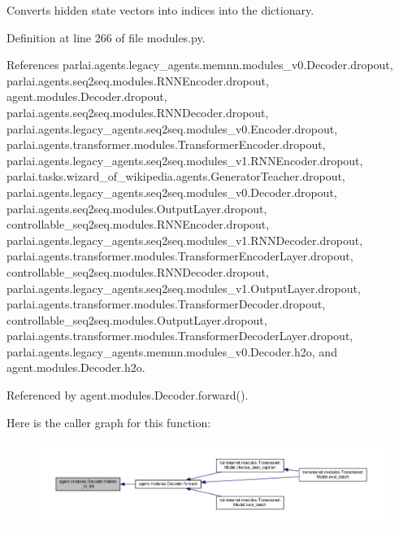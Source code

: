\begin{DoxyVerb}Converts hidden state vectors into indices into the dictionary.\end{DoxyVerb}
 

Definition at line 266 of file modules.\+py.



References parlai.\+agents.\+legacy\+\_\+agents.\+memnn.\+modules\+\_\+v0.\+Decoder.\+dropout, parlai.\+agents.\+seq2seq.\+modules.\+R\+N\+N\+Encoder.\+dropout, agent.\+modules.\+Decoder.\+dropout, parlai.\+agents.\+seq2seq.\+modules.\+R\+N\+N\+Decoder.\+dropout, parlai.\+agents.\+legacy\+\_\+agents.\+seq2seq.\+modules\+\_\+v0.\+Encoder.\+dropout, parlai.\+agents.\+transformer.\+modules.\+Transformer\+Encoder.\+dropout, parlai.\+agents.\+legacy\+\_\+agents.\+seq2seq.\+modules\+\_\+v1.\+R\+N\+N\+Encoder.\+dropout, parlai.\+tasks.\+wizard\+\_\+of\+\_\+wikipedia.\+agents.\+Generator\+Teacher.\+dropout, parlai.\+agents.\+legacy\+\_\+agents.\+seq2seq.\+modules\+\_\+v0.\+Decoder.\+dropout, parlai.\+agents.\+seq2seq.\+modules.\+Output\+Layer.\+dropout, controllable\+\_\+seq2seq.\+modules.\+R\+N\+N\+Encoder.\+dropout, parlai.\+agents.\+legacy\+\_\+agents.\+seq2seq.\+modules\+\_\+v1.\+R\+N\+N\+Decoder.\+dropout, parlai.\+agents.\+transformer.\+modules.\+Transformer\+Encoder\+Layer.\+dropout, controllable\+\_\+seq2seq.\+modules.\+R\+N\+N\+Decoder.\+dropout, parlai.\+agents.\+legacy\+\_\+agents.\+seq2seq.\+modules\+\_\+v1.\+Output\+Layer.\+dropout, parlai.\+agents.\+transformer.\+modules.\+Transformer\+Decoder.\+dropout, controllable\+\_\+seq2seq.\+modules.\+Output\+Layer.\+dropout, parlai.\+agents.\+transformer.\+modules.\+Transformer\+Decoder\+Layer.\+dropout, parlai.\+agents.\+legacy\+\_\+agents.\+memnn.\+modules\+\_\+v0.\+Decoder.\+h2o, and agent.\+modules.\+Decoder.\+h2o.



Referenced by agent.\+modules.\+Decoder.\+forward().

Here is the caller graph for this function\+:
\nopagebreak
\begin{figure}[H]
\begin{center}
\leavevmode
\includegraphics[width=350pt]{classagent_1_1modules_1_1Decoder_ad0179be7c6224482204f3ce575894573_icgraph}
\end{center}
\end{figure}


